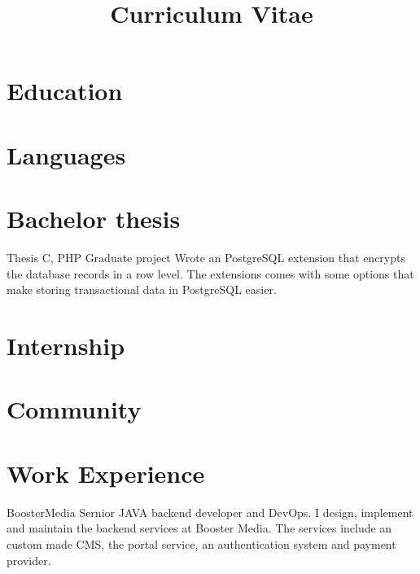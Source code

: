 \documentclass[11pt,a4paper]{moderncv}
\title{Curriculum Vitae}
\begin{document}
\maketitle

\section{Education}

\section{Languages}

\section{Bachelor thesis}
{Thesis}
{C, PHP}
{Graduate project}{}
{
Wrote an PostgreSQL extension that encrypts the database records in a row
level. The extensions comes with some options that make storing transactional
data in PostgreSQL easier.
}

\section{Internship}

\section{Community}

\section{Work Experience}

\vspace*{0.2\baselineskip}
{BoosterMedia}
{}
{}
{}
{
Sernior JAVA backend developer and DevOps.
I design, implement and maintain the backend services at Booster Media.
The services include an custom made CMS, the portal service,
an authentication system and payment provider.
}
\end{document}
